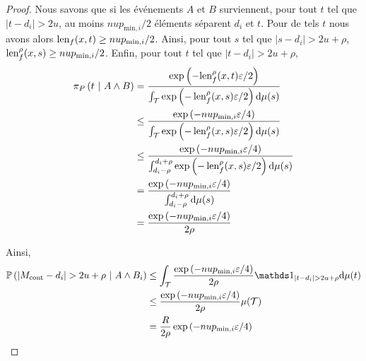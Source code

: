 \begin{proof}
    Nous savons que si les événements \(A\) et \(B\) surviennent, pour tout \(t\) tel que \(|t - d_i| > 2u\), au moins \(nup_{\text{min}, i}/2\) éléments séparent \(d_i\) et \(t\). Pour de tels \(t\) nous avons alors \(\operatorname{len}_f(x,t) \geq nup_{\text{min}, i}/2\). Ainsi, pour tout \(s\) tel que \(|s - d_i| > 2u + \rho\), \(\operatorname{len}_f^\rho(x,s) \geq nup_{\text{min}, i}/2\). Enfin, pour tout \(t\) tel que \(|t - d_i| > 2u + \rho\),
    \begin{align*}
        \pi_P\left( t\ |\ A \wedge B \right) & = \dfrac{\exp\left( -{\operatorname{len}_f^\rho(x,t)\varepsilon}/{2} \right)}{\int_\mathcal T \exp\left( {-\operatorname{len}_f^\rho(x,s)\varepsilon}/{2} \right)\mathrm{d} \mu(s)}\\
        & \leq \dfrac{\exp\left( -{nup_{\text{min}, i}\varepsilon}/{4} \right)}{\int_\mathcal T \exp\left( {-\operatorname{len}_f^\rho(x,s)\varepsilon}/{2} \right)\mathrm{d} \mu(s)}\\
        & \leq \dfrac{\exp\left( -{nup_{\text{min}, i}\varepsilon}/{4} \right)}{\int_{d_i-\rho}^{d_i+\rho} \exp\left( {-\operatorname{len}_f^\rho(x,s)\varepsilon}/{2} \right)\mathrm{d} \mu(s)}\\
        & = \dfrac{\exp\left( -{nup_{\text{min}, i}\varepsilon}/{4} \right)}{\int_{d_i-\rho}^{d_i+\rho}\mathrm{d} \mu(s)}\\
        & = \dfrac{\exp\left( -{nup_{\text{min}, i}\varepsilon}/{4} \right)}{2\rho}\\
    \end{align*}

    Ainsi,
    \begin{align*}
        \mathbb P\left( |M_{\text{cont}} - d_i| > 2u + \rho \ | \ A \wedge B_i\right) & \leq \int_\mathcal T \dfrac{\exp\left( -{nup_{\text{min}, i}\varepsilon}/{4} \right)}{2\rho}\un_{| t - d_i| > 2u + \rho} \dt\mu(t)\\
        & \leq \dfrac{\exp\left( -{nup_{\text{min}, i}\varepsilon}/{4} \right)}{2\rho} \mu(\mathcal T)\\
        & = \dfrac{R}{2\rho}\exp\left( -{nup_{\text{min}, i}\varepsilon}/{4} \right)
    \end{align*}


\end{proof}
